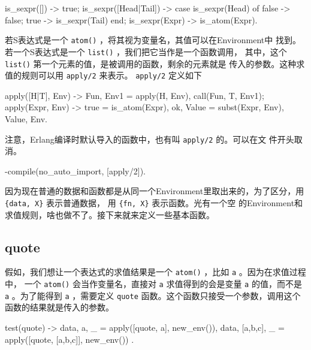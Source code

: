 \documentclass[preview,multi,crop=false,border=1in,class=memoir]{standalone}
\begin{document}
\begin{preview-page}
\begin{Answer}
\begin{SourceCode}
is_sexpr([]) ->
    true;
is_sexpr([Head|Tail]) ->
    case is_sexpr(Head) of
        false ->
            false;
        true ->
            is_sexpr(Tail)
    end;
is_sexpr(Expr) ->
    is_atom(Expr).
\end{SourceCode}
\end{Answer}

\nonzeroparskip

若S表达式是一个 \verb|atom()| ，将其视为变量名，其值可以在Environment中
找到。若一个S表达式是一个 \verb|list()| ，我们把它当作是一个函数调用，
其中，这个 \verb|list()| 第一个元素的值，是被调用的函数，剩余的元素就是
传入的参数。这种求值的规则可以用 \verb|apply/2| 来表示。
\verb|apply/2| 定义如下

\begin{SourceCode}
apply([H|T], Env) ->
    {Fun, Env1} = apply(H, Env),
    call(Fun, T, Env1);
apply(Expr, Env) ->
    true = is_atom(Expr),
    {ok, Value} = subst(Expr, Env),
    {Value, Env}.
\end{SourceCode}

注意，Erlang编译时默认导入的函数中，也有叫 \verb|apply/2| 的。可以在文
件开头取消。

\begin{SourceCode}
-compile({no_auto_import, [apply/2]}).
\end{SourceCode}

因为现在普通的数据和函数都是从同一个Environment里取出来的，为了区分，用
\verb|{data, X}| 表示普通数据， 用 \verb|{fn, X}| 表示函数。光有一个空
的Environment和求值规则，啥也做不了。接下来就来定义一些基本函数。

\subsection{quote}

假如，我们想让一个表达式的求值结果是一个 \verb|atom()| ，比如 \verb|a|
。因为在求值过程中， 一个 \verb|atom()| 会当作变量名，直接对 \verb|a|
求值得到的会是变量 \verb|a| 的值，而不是 \verb|a| 。为了能得到
\verb|a| ，需要定义 \verb|quote| 函数。这个函数只接受一个参数，调用这个
函数的结果就是传入的参数。

\begin{SourceCode}
test(quote) ->
    {{data, a}, _} =
        apply([quote, a], new_env()),
    {{data, [a,b,c]}, _} =
        apply([quote, [a,b,c]], new_env())
.
\end{SourceCode}


\end{preview-page}
\end{document}
